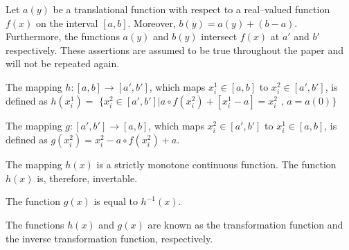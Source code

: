 \documentclass[twoside,reqno,11pt]{fcaa-var} %
\begin{document}
Let $a(y)$ be a translational function with respect to a real--valued function $f(x)$ on the interval $[a,b]$. Moreover, $b(y) = a(y) + (b-a)$. Furthermore, the functions $a(y)$ and $b(y)$ intersect $f(x)$ at $a'$ and $b'$ respectively.
These assertions are assumed to be true throughout the paper and will not be repeated again.

\begin{definition}\label{def:h}
The mapping $h : [a, b] \rightarrow [a',b']$, which maps $x_i^1 \in [a, b]$ to $x_i^2 \in [a',b']$, is defined as
$h(x_i^1) =$ $\{x_i^2 \in [a' ,b'] | a\circ f(x_i^2) + [x_i^1 - a] = x_i^2$ , $a = a(0)\}$
\end{definition}

\begin{definition}\label{def:g}
The mapping $g:[a', b'] \rightarrow [a, b]$, which maps $x_i^2 \in [a' , b']$ to $x_i^1\in [a, b]$,
is defined as $g(x_i^2) = x_i^2 - a \circ f (x_i^2) + a$.
\end{definition}

\begin{theorem}
The mapping $h(x)$ is a strictly monotone continuous function. The function $h(x)$ is, therefore, invertable.
\end{theorem}

\begin{theorem}
\label{t:inv}
The function $g(x)$ is equal to $h^{-1}(x)$.
\end{theorem}

\noindent
The functions $h(x)$ and $g(x)$ are known as the transformation function and the inverse transformation function, respectively. 
\end{document}
